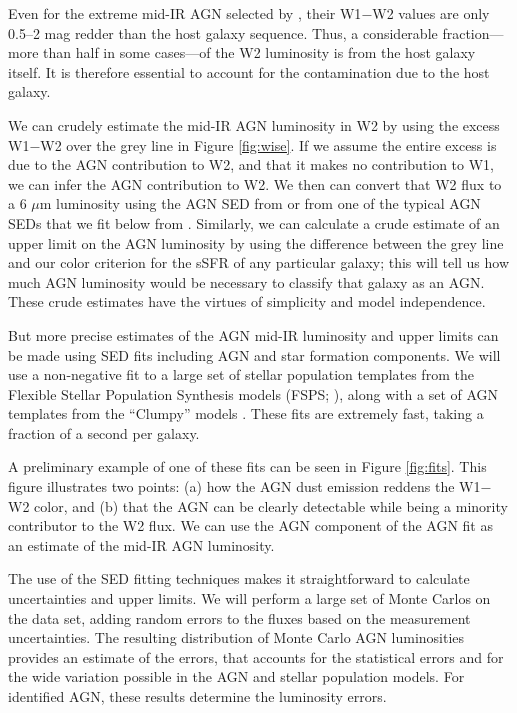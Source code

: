 \documentclass[12pt, preprint]{hacked-aastex}
\begin{document}
Even for the extreme mid-IR AGN selected by \cite{assef18a}, 
their W1$-$W2 values are only 0.5--2 mag redder than the host 
galaxy sequence. Thus,  a considerable fraction---more than 
half in some cases---of the  W2 luminosity is from the host 
galaxy itself. It is therefore essential to account for the
contamination due to the host galaxy.

We can crudely estimate the mid-IR AGN luminosity in W2 by 
using the excess W1$-$W2 over the grey line in Figure \ref{fig:wise}.
If we assume the entire excess is due to the AGN contribution to
W2, and that it makes no contribution to W1, we can infer
the AGN contribution to W2. We then can convert that W2 flux
to a 6 $\mu$m luminosity using the AGN SED from \cite{richards06a} 
or from one of the typical AGN SEDs that we fit below from 
\cite{nenkova08a}. 
Similarly, we can calculate a crude estimate of an upper limit 
on the AGN luminosity by using the difference between the grey 
line and our color criterion for the sSFR of any particular galaxy;
this will tell us how much AGN luminosity would be necessary to 
classify that galaxy as an AGN.
These crude estimates have the virtues of simplicity
and model independence.

But more precise estimates of the AGN mid-IR luminosity and 
upper limits can be made using SED fits including AGN and 
star formation components. We will use a non-negative fit to 
a large set of stellar population templates from the Flexible Stellar
Population Synthesis models (FSPS; \cite{conroy09a}), along with 
a set of AGN templates from the ``Clumpy'' models \cite{nenkova08a}.
These fits are extremely fast, taking a fraction of a second 
per galaxy.

A preliminary example of one of these fits can be seen in Figure
\ref{fig:fits}. This figure illustrates two points: (a) 
how the AGN dust emission reddens the W1$-$W2 color, and (b)
that the AGN can be clearly detectable while being a minority
contributor to the W2 flux. We can use the AGN component of the
AGN fit as an estimate of the mid-IR AGN luminosity.

The use of the SED fitting techniques makes it straightforward
to calculate uncertainties and upper limits. 
We will perform a large set
of Monte Carlos on the data set, adding random errors to the 
fluxes based on the measurement uncertainties. The resulting
distribution of Monte Carlo AGN luminosities provides an 
estimate of the errors, that accounts for the statistical 
errors and for the wide variation possible in the AGN and 
stellar population models. For identified AGN, these results
determine the luminosity errors. 
\end{document}
